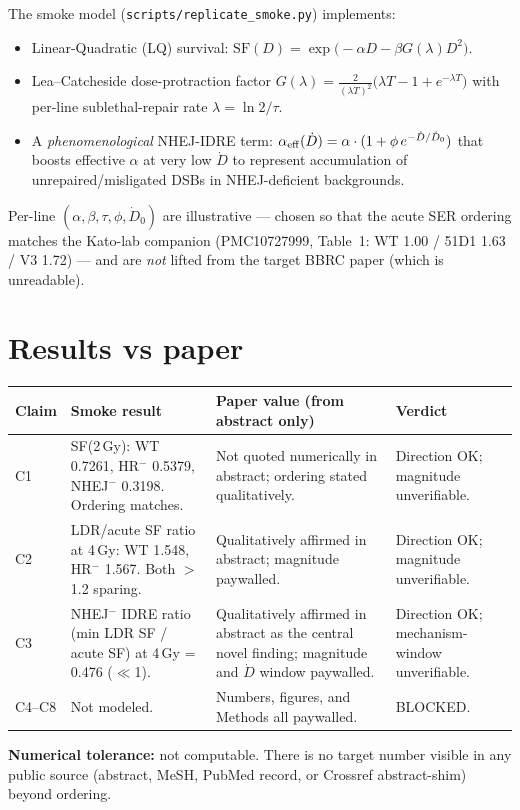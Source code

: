 \documentclass[11pt]{article}
\begin{document}
The smoke model (\texttt{scripts/replicate\_smoke.py}) implements:
\begin{itemize}
\item Linear-Quadratic (LQ) survival: $\mathrm{SF}(D) = \exp\!\bigl(-\alpha D - \beta G(\lambda) D^2\bigr)$.
\item Lea--Catcheside dose-protraction factor
  $G(\lambda) = \frac{2}{(\lambda T)^2}\bigl(\lambda T - 1 + e^{-\lambda T}\bigr)$
  with per-line sublethal-repair rate $\lambda = \ln 2 / \tau$.
\item A \emph{phenomenological} NHEJ-IDRE term: $\alpha_{\rm eff}(\dot D) = \alpha \cdot (1 + \phi\,e^{-\dot D / \dot D_0})$
  that boosts effective $\alpha$ at very low $\dot D$ to represent accumulation of
  unrepaired/misligated DSBs in NHEJ-deficient backgrounds.
\end{itemize}
Per-line $(\alpha, \beta, \tau, \phi, \dot D_0)$ are illustrative --- chosen so that the acute
SER ordering matches the Kato-lab companion (PMC10727999, Table~1: WT 1.00 / 51D1 1.63 / V3
1.72) --- and are \emph{not} lifted from the target BBRC paper (which is unreadable).

\section{Results vs paper}

\begin{longtable}{p{1cm} p{5cm} p{5.5cm} p{2.5cm}}
\toprule
Claim & Smoke result & Paper value (from abstract only) & Verdict \\
\midrule
\endhead
C1 & SF(2\,Gy): WT 0.7261, HR$^-$ 0.5379, NHEJ$^-$ 0.3198. Ordering matches. & Not quoted numerically in abstract; ordering stated qualitatively. & Direction OK; magnitude unverifiable. \\
C2 & LDR/acute SF ratio at 4\,Gy: WT 1.548, HR$^-$ 1.567. Both $>$1.2 sparing. & Qualitatively affirmed in abstract; magnitude paywalled. & Direction OK; magnitude unverifiable. \\
C3 & NHEJ$^-$ IDRE ratio (min LDR SF / acute SF) at 4\,Gy = 0.476 ($\ll$1). & Qualitatively affirmed in abstract as the central novel finding; magnitude and $\dot D$ window paywalled. & Direction OK; mechanism-window unverifiable. \\
C4--C8 & Not modeled. & Numbers, figures, and Methods all paywalled. & BLOCKED. \\
\bottomrule
\end{longtable}

\textbf{Numerical tolerance:} not computable. There is no target number visible in any public
source (abstract, MeSH, PubMed record, or Crossref abstract-shim) beyond ordering.
\end{document}
